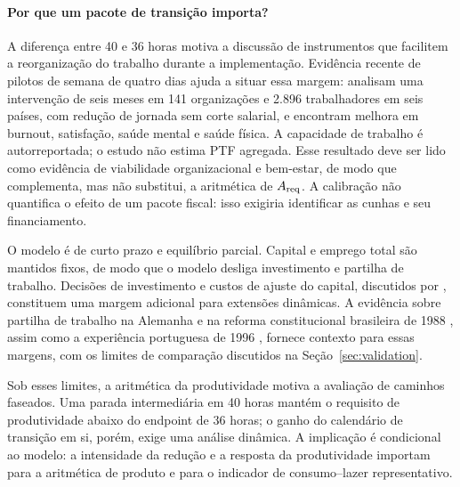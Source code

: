 \paragraph{Por que um pacote de transição importa?} A diferença entre 40 e 36 horas motiva a discussão de instrumentos que facilitem a reorganização do trabalho durante a implementação. Evidência recente de pilotos de semana de quatro dias ajuda a situar essa margem: \citet{FanSchorKellyGu2025} analisam uma intervenção de seis meses em 141 organizações e 2.896 trabalhadores em seis países, com redução de jornada sem corte salarial, e encontram melhora em burnout, satisfação, saúde mental e saúde física. A capacidade de trabalho é autorreportada; o estudo não estima PTF agregada. Esse resultado deve ser lido como evidência de viabilidade organizacional e bem-estar, de modo que complementa, mas não substitui, a aritmética de $A_{\mathrm{req}}$. A calibração não quantifica o efeito de um pacote fiscal: isso exigiria identificar as cunhas e seu financiamento.

O modelo é de curto prazo e equilíbrio parcial. Capital e emprego total são mantidos fixos, de modo que o modelo desliga investimento e partilha de trabalho. Decisões de investimento e custos de ajuste do capital, discutidos por \citet{Caballero1999}, constituem uma margem adicional para extensões dinâmicas. A evidência sobre partilha de trabalho na Alemanha \citep{Hunt1996} e na reforma constitucional brasileira de 1988 \citep{GonzagaMenezesFilhoCamargo2003}, assim como a experiência portuguesa de 1996 \citep{AsaiLopesTondini2024}, fornece contexto para essas margens, com os limites de comparação discutidos na Seção~\ref{sec:validation}.

Sob esses limites, a aritmética da produtividade motiva a avaliação de caminhos faseados. Uma parada intermediária em 40 horas mantém o requisito de produtividade abaixo do endpoint de 36 horas; o ganho do calendário de transição em si, porém, exige uma análise dinâmica. A implicação é condicional ao modelo: a intensidade da redução e a resposta da produtividade importam para a aritmética de produto e para o indicador de consumo--lazer representativo.

\FloatBarrier
